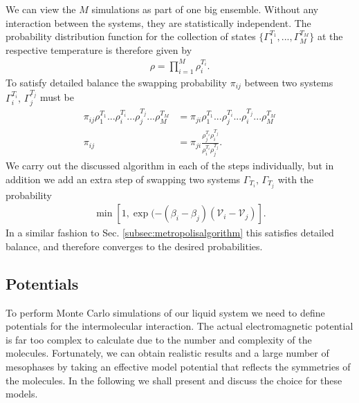We can view the $M$ simulations as part of one big ensemble. Without any interaction between the systems, they are statistically independent. The probability distribution function for the collection of states $\{\Gamma^{T_1}_1,...,\Gamma^{T_M}_M\}$ at the respective temperature is therefore given by
\begin{align}
    \rho = \displaystyle\prod_{i=1}^M \rho^{T_i}_i.
\end{align}
To satisfy detailed balance the swapping probability $\pi_{ij}$ between two systems $\Gamma_i^{T_i},\,\Gamma_j^{T_j}$ must be
\begin{align}
    \pi_{ij} \rho^{T_1}_1...\rho^{T_i}_i...\rho^{T_j}_j...\rho^{T_M}_M &= \pi_{ji} \rho^{T_1}_1...\rho^{T_i}_j...\rho^{T_j}_i...\rho^{T_M}_M \\
    \pi_{ij} &= \pi_{ji} \frac{\rho^{T_i}_j\rho^{T_j}_i}{\rho^{T_i}_i\rho^{T_j}_j}.
\end{align}
We carry out the discussed algorithm in each of the steps individually, but in addition we add an extra step of swapping two systems $\Gamma_{T_i},\, \Gamma_{T_j}$ with the probability
\begin{align}
    \min\left\lbrack1, \exp(-(\beta_i-\beta_j)(\mathcal{V}_i-\mathcal{V}_j)\right\rbrack.
\end{align}
In a similar fashion to Sec. \ref{subsec:metropolisalgorithm} this satisfies detailed balance, and therefore converges to the desired probabilities.




\subsection{Potentials}
\label{subsec:potentials}
To perform Monte Carlo simulations of our liquid system we need to define potentials for the intermolecular interaction. The actual electromagnetic potential is far too complex to calculate due to the number and complexity of the molecules. Fortunately, we can obtain realistic results and a large number of mesophases by taking an effective model potential that reflects the symmetries of the molecules. In the following we shall present and discuss the choice for these models.

